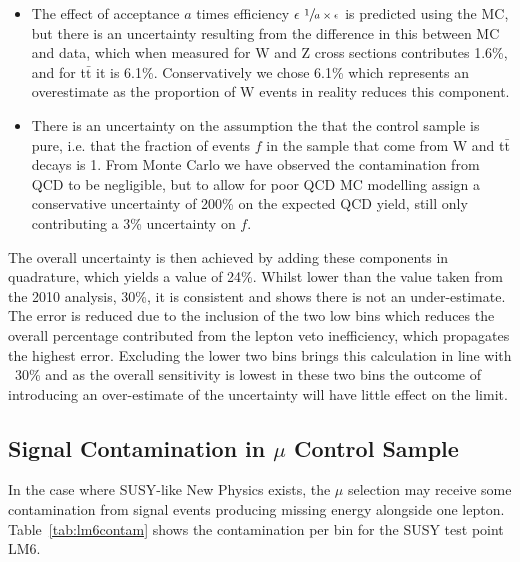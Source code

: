 \begin{itemize}
\begin{itemize}
\end{itemize}
\item The effect of acceptance $a$ times efficiency $\epsilon$ $\sfrac{1}{a \times \epsilon}$ is predicted using the MC, but there is an uncertainty resulting from the difference in this between MC and data, which when measured for W and Z cross sections contributes 1.6\%, and for t$\bar{\textrm{t}}$ it is 6.1\%. Conservatively we chose 6.1\% which represents an overestimate as the proportion of W events in reality reduces this component.
\item There is an uncertainty on the assumption the that the control sample is pure, i.e. that the fraction of events $f$ in the sample that come from W and t$\bar{\textrm{t}}$ decays is 1. From Monte Carlo we have observed the contamination from QCD to be negligible, but to allow for poor QCD MC modelling assign a conservative uncertainty of 200\% on the expected QCD yield, still only contributing a 3\% uncertainty on $f$.
\end{itemize}

The overall uncertainty is then achieved by adding these components in quadrature, which yields a value of 24\%. Whilst lower than the value taken from the 2010 analysis, 30\%, it is consistent and shows there is not an under-estimate. The error is reduced due to the inclusion of the two low \HT bins which reduces the overall percentage contributed from the lepton veto inefficiency, which propagates the highest error. Excluding the lower two bins brings this calculation in line with ~30\% and as the overall sensitivity is lowest in these two bins the outcome of introducing an over-estimate of the uncertainty will have little effect on the limit. 


\subsection{Signal Contamination in $\mu$ Control Sample}

In the case where SUSY-like New Physics exists, the $\mu$ selection may receive some contamination from signal events producing missing energy alongside one lepton. Table~\ref{tab:lm6contam} shows the contamination per bin for the SUSY test point LM6. 



